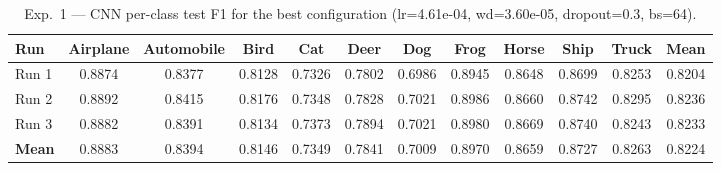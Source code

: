 \begin{table}[H]
\centering
\caption{Exp.\ 1 — CNN per-class test F1 for the best configuration (lr=4.61e-04, wd=3.60e-05, dropout=0.3, bs=64).}
\label{tab:exp1_cnn_perclass}
\small
\begin{tabular}{lccccccccccc}
\toprule
\textbf{Run} & \textbf{Airplane} & \textbf{Automobile} & \textbf{Bird} & \textbf{Cat} & \textbf{Deer} & \textbf{Dog} & \textbf{Frog} & \textbf{Horse} & \textbf{Ship} & \textbf{Truck} & \textbf{Mean} \\
\midrule
Run 1 & 0.8874 & 0.8377 & 0.8128 & 0.7326 & 0.7802 & 0.6986 & 0.8945 & 0.8648 & 0.8699 & 0.8253 & 0.8204 \\
Run 2 & 0.8892 & 0.8415 & 0.8176 & 0.7348 & 0.7828 & 0.7021 & 0.8986 & 0.8660 & 0.8742 & 0.8295 & 0.8236 \\
Run 3 & 0.8882 & 0.8391 & 0.8134 & 0.7373 & 0.7894 & 0.7021 & 0.8980 & 0.8669 & 0.8740 & 0.8243 & 0.8233 \\
\midrule
\textbf{Mean} & 0.8883 & 0.8394 & 0.8146 & 0.7349 & 0.7841 & 0.7009 & 0.8970 & 0.8659 & 0.8727 & 0.8263 & 0.8224 \\
\bottomrule
\end{tabular}
\end{table}
